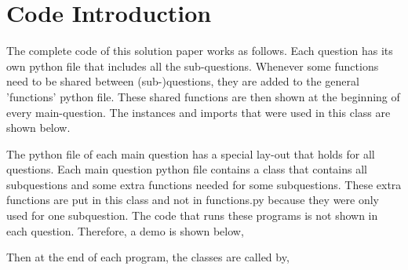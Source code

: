 \section*{Code Introduction}

The complete code of this solution paper works as follows. Each question has its own python file that includes all the sub-questions. Whenever some functions need to be shared between (sub-)questions, they are added to the general 'functions' python file. These shared functions are then shown at the beginning of every main-question. The instances and imports that were used in this class are shown below.


\newpage
The python file of each main question has a special lay-out that holds for all questions. Each main question python file contains a class that contains all subquestions and some extra functions needed for some subquestions. These extra functions are put in this class and not in functions.py because they were only used for one subquestion. The code that runs these programs is not shown in each question. Therefore, a demo is shown below,


Then at the end of each program, the classes are called by,

